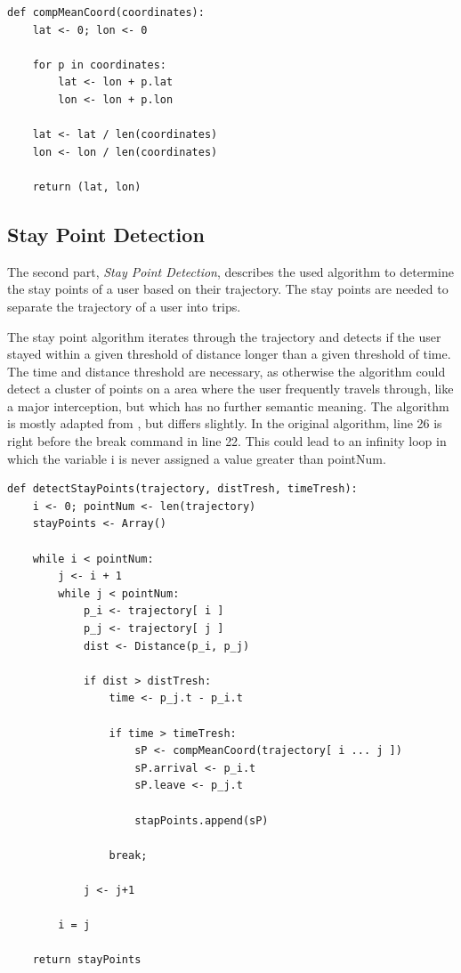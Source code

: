 \begin{lstlisting}[style=py, caption={Pseudocode: Compute Mean Coordinate \cite{Zheng:2015:TDM:2764959.2743025} }, label={code:meanCoord}]
def compMeanCoord(coordinates):
    lat <- 0; lon <- 0
    
    for p in coordinates:
        lat <- lon + p.lat
        lon <- lon + p.lon
        
    lat <- lat / len(coordinates)
    lon <- lon / len(coordinates)
    
    return (lat, lon)
\end{lstlisting}

\subsection{Stay Point Detection}
The second part, \textit{Stay Point Detection}, describes the used algorithm to determine the stay points of a user based on their trajectory. The stay points are needed to separate the trajectory of a user into trips.

The stay point algorithm iterates through the trajectory and detects if the user stayed within a given threshold of distance longer than a given threshold of time. The time and distance threshold are necessary, as otherwise the algorithm could detect a cluster of points on a area where the user frequently travels through, like a major interception, but which has no further semantic meaning. The algorithm is mostly adapted from \cite{li2008mining}, but differs slightly. In the original algorithm, line 26 is right before the break command in line 22. This could lead to an infinity loop in which the variable i is never assigned a value greater than pointNum. \cite{li2008mining}


\cite{li2008mining}

\begin{lstlisting}[style=py, caption={Pseudocode: Stay Point Detection \cite{li2008mining}}, label={code:stayPoint}]
def detectStayPoints(trajectory, distTresh, timeTresh):
    i <- 0; pointNum <- len(trajectory)
    stayPoints <- Array()
    
    while i < pointNum:
        j <- i + 1
        while j < pointNum:
            p_i <- trajectory[ i ]
            p_j <- trajectory[ j ]
            dist <- Distance(p_i, p_j)
            
            if dist > distTresh:
                time <- p_j.t - p_i.t
                
                if time > timeTresh:
                    sP <- compMeanCoord(trajectory[ i ... j ])
                    sP.arrival <- p_i.t
                    sP.leave <- p_j.t
                    
                    stapPoints.append(sP)
                
                break;
            
            j <- j+1
        
        i = j
    
    return stayPoints
\end{lstlisting}



